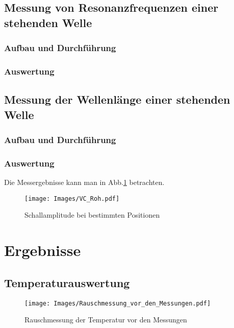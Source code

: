 \documentclass[]{article}
\begin{document}
	
	\subsection{Messung von Resonanzfrequenzen einer stehenden Welle}
	\subsubsection{Aufbau und Durchführung}
	\subsubsection{Auswertung}
	
	\subsection{Messung der Wellenlänge einer stehenden Welle}
	\subsubsection{Aufbau und Durchführung}
	\subsubsection{Auswertung}
	
	Die Messergebnisse kann man in Abb.\ref{Vc_Roh} betrachten.

	\begin{figure}
	\begin{center}
		\texttt{[image: Images/VC\_Roh.pdf]}
		\caption{Schallamplitude bei bestimmten Positionen}
		\label{Vc_Roh}
	\end{center}
	\end{figure}
	

	\section{Ergebnisse}
	\subsection{Temperaturauswertung}
	
	\begin{figure}
	\begin{center}
		\texttt{[image: Images/Rauschmessung\_vor\_den\_Messungen.pdf]}
		\caption{Rauschmessung der Temperatur vor den Messungen}
		\label{Temp_vorn}
	\end{center}
	\end{figure}	
\end{document}
